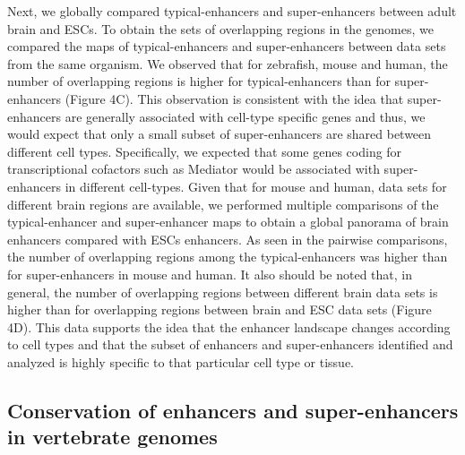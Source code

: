 		Next, we globally compared typical-enhancers and super-enhancers between adult brain and ESCs. To obtain the sets of overlapping regions in the genomes, we compared the maps of typical-enhancers and super-enhancers between data sets from the same organism. We observed that for zebrafish, mouse and human, the number of overlapping regions is higher for typical-enhancers than for super-enhancers (Figure 4C). This observation is consistent with the idea that super-enhancers are generally associated with cell-type specific genes and thus, we would expect that only a small subset of super-enhancers are shared between different cell types. Specifically, we expected that some genes coding for transcriptional cofactors such as Mediator would be associated with super-enhancers in different cell-types. Given that for mouse and human, data sets for different brain regions are available, we performed multiple comparisons of the typical-enhancer and super-enhancer maps to obtain a global panorama of brain enhancers compared with ESCs enhancers. As seen in the pairwise comparisons, the number of overlapping regions among the typical-enhancers was higher than for super-enhancers in mouse and human. It also should be noted that, in general, the number of overlapping regions between different brain data sets is higher than for overlapping regions between brain and ESC data sets (Figure 4D). This data supports the idea that the enhancer landscape changes according to cell types and that the subset of enhancers and super-enhancers identified and analyzed is highly specific to that particular cell type or tissue.\\

	\subsection{Conservation of enhancers and super-enhancers in vertebrate genomes}

